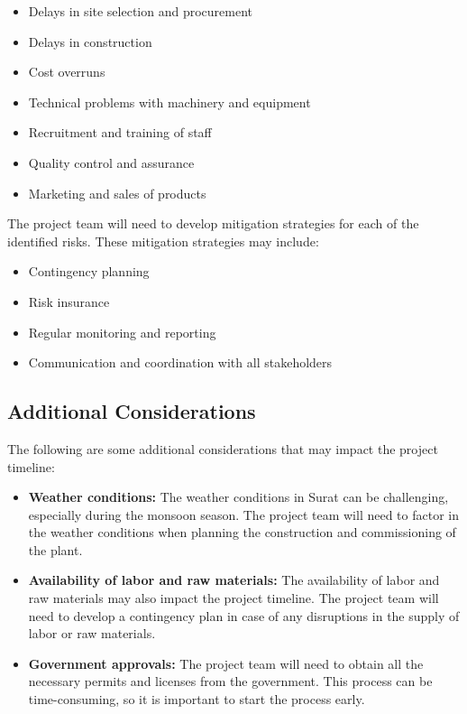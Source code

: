 \begin{itemize}
    \item Delays in site selection and procurement
    \item Delays in construction
    \item Cost overruns
    \item Technical problems with machinery and equipment
    \item Recruitment and training of staff
    \item Quality control and assurance
    \item Marketing and sales of products
\end{itemize}

The project team will need to develop mitigation strategies for each of the identified risks. These mitigation strategies may include:

\begin{itemize}
    \item Contingency planning
    \item Risk insurance
    \item Regular monitoring and reporting
    \item Communication and coordination with all stakeholders
\end{itemize}

\subsection{Additional Considerations}

The following are some additional considerations that may impact the project timeline:

\begin{itemize}
    \item \textbf{Weather conditions:} The weather conditions in Surat can be challenging, especially during the monsoon season. The project team will need to factor in the weather conditions when planning the construction and commissioning of the plant.
    \item \textbf{Availability of labor and raw materials:} The availability of labor and raw materials may also impact the project timeline. The project team will need to develop a contingency plan in case of any disruptions in the supply of labor or raw materials.
    \item \textbf{Government approvals:} The project team will need to obtain all the necessary permits and licenses from the government. This process can be time-consuming, so it is important to start the process early.
\end{itemize}


